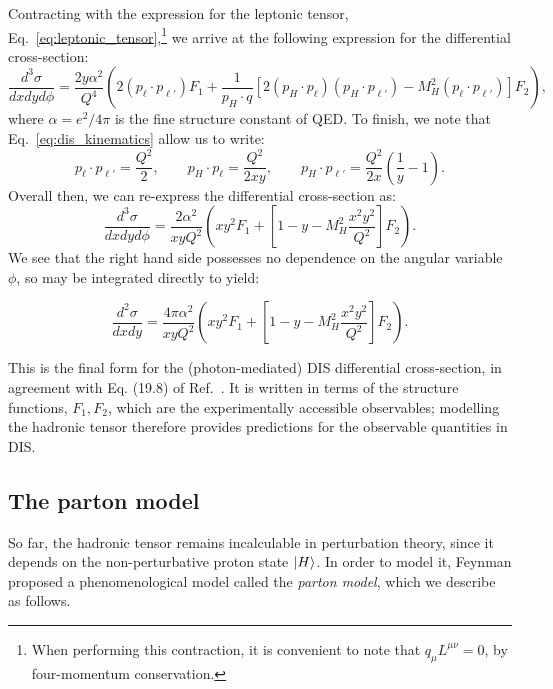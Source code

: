 \documentclass[withindex,glossary]{cam-thesis}
\begin{document}
Contracting with the expression for the leptonic tensor, Eq.~\eqref{eq:leptonic_tensor},\footnote{When performing this contraction, it is convenient to note that $q_{\mu} L^{\mu\nu} = 0$, by four-momentum conservation.} we arrive at the following expression for the differential cross-section:
\begin{equation}
\frac{d^3\sigma}{dx dy d\phi} = \frac{2y \alpha^2}{Q^4} \left( 2(p_{\ell} \cdot p_{\ell'}) F_1 + \frac{1}{p_H \cdot q} [2 (p_H \cdot p_{\ell}) (p_H \cdot p_{\ell'}) - M_H^2 (p_{\ell} \cdot p_{\ell'})] F_2 \right),
\end{equation}
where $\alpha = e^2 / 4\pi$ is the fine structure constant of QED. To finish, we note that Eq.~\eqref{eq:dis_kinematics} allow us to write:
\begin{equation}
p_{\ell} \cdot p_{\ell'} = \frac{Q^2}{2}, \qquad p_H \cdot p_{\ell} = \frac{Q^2}{2xy}, \qquad p_H \cdot p_{\ell'} = \frac{Q^2}{2x} \left( \frac{1}{y} - 1 \right). 
\end{equation}
Overall then, we can re-express the differential cross-section as:
\begin{equation}
\frac{d^3\sigma}{dx dy d\phi} = \frac{2\alpha^2}{xy Q^2} \left(xy^2F_1 + \left[1 - y - M_H^2 \frac{x^2y^2}{Q^2}\right] F_2\right).
\end{equation}
We see that the right hand side possesses no dependence on the angular variable $\phi$, so may be integrated directly to yield:
\begin{framed}
\begin{equation}
\frac{d^2\sigma}{dx dy} = \frac{4\pi\alpha^2}{xy Q^2} \left(xy^2F_1 + \left[1 - y - M_H^2 \frac{x^2y^2}{Q^2}\right] F_2 \right).
\end{equation}
\end{framed}
This is the final form for the (photon-mediated) DIS differential cross-section, in agreement with Eq. (19.8) of Ref.~\cite{ParticleDataGroup:2022pth}. It is written in terms of the structure functions, $F_1, F_2$, which are the experimentally accessible observables; modelling the hadronic tensor therefore provides predictions for the observable quantities in DIS.


\subsection{The parton model}
So far, the hadronic tensor remains incalculable in perturbation theory, since it depends on the non-perturbative proton state $\ket{H}$. In order to model it, Feynman proposed a phenomenological model called the \textit{parton model}, which we describe as follows. 
\end{document}
